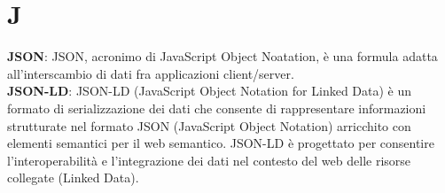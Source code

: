\section{J}
\textbf{JSON}: JSON, acronimo di JavaScript Object Noatation, è una formula adatta all'interscambio di dati fra applicazioni client/server.\\
\textbf{JSON-LD}: JSON-LD (JavaScript Object Notation for Linked Data) è un formato di serializzazione dei dati che consente di rappresentare informazioni strutturate nel formato JSON (JavaScript Object Notation) arricchito con elementi semantici per il web semantico. JSON-LD è progettato per consentire l'interoperabilità e l'integrazione dei dati nel contesto del web delle risorse collegate (Linked Data).

